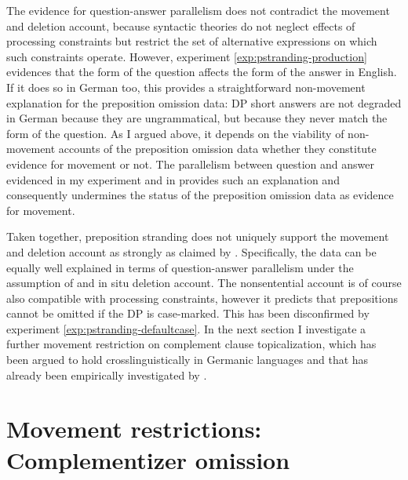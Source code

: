 The evidence for question-answer parallelism does not contradict the movement and deletion account, because syntactic theories do not neglect effects of processing constraints but restrict the set of alternative expressions on which such constraints operate. However, experiment \ref{exp:pstranding-production} evidences that the form of the question affects the form of the answer in English. If it does so in German too, this provides a straightforward non-movement explanation for the preposition omission data: DP short answers are not degraded in German because they are ungrammatical, but because they never match the form of the question. As I argued above, it depends on the viability of non-movement accounts of the preposition omission data whether they constitute evidence for movement or not. The parallelism between question and answer evidenced in my experiment and in \citet{nykiel2017} provides such an explanation and consequently undermines the status of the preposition omission data as evidence for movement.

Taken together, preposition stranding does not uniquely support the movement and deletion account as strongly as claimed by \citet{merchant2004}. Specifically, the data can be equally well explained in terms of question-answer parallelism under the assumption of and in situ deletion account. The nonsentential account is of course also compatible with processing constraints, however it predicts that prepositions cannot be omitted if the DP is case-marked. This has been disconfirmed by experiment \ref{exp:pstranding-defaultcase}. In the next section I investigate a further movement restriction on complement clause topicalization, which has been argued to hold crosslinguistically in Germanic languages \citep{webelhuth1992} and that has already been empirically investigated by \citet{merchant.etal2013}.


\section{Movement restrictions: Complementizer omission}\label{sec:ccs}
\largerpage


